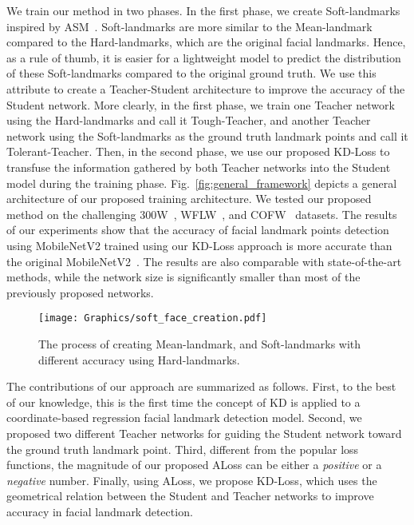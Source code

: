 \documentclass[times,twocolumn,final,authoryear]{elsarticle}
\begin{document}
We train our method in two phases. In the first phase, we create Soft-landmarks inspired by ASM~\cite{cootes1998active}. Soft-landmarks are more similar to the Mean-landmark compared to the Hard-landmarks, which are the original facial landmarks. Hence, as a rule of thumb, it is easier for a lightweight model to predict the distribution of these Soft-landmarks compared to the original ground truth. We use this attribute to create a Teacher-Student architecture to improve the accuracy of the Student network. More clearly, in the first phase, we train one Teacher network using the Hard-landmarks and call it Tough-Teacher, and another Teacher network using the Soft-landmarks as the ground truth landmark points and call it Tolerant-Teacher.
Then, in the second phase, we use our proposed KD-Loss to transfuse the information gathered by both Teacher networks into the Student model during the training phase. Fig.~\ref{fig:general_framework} depicts a general architecture of our proposed training architecture. We tested our proposed method on the challenging 300W~\cite{sagonas2013300}, WFLW~\cite{wu2018look}, and COFW~\cite{burgos2013robust} datasets. The results of our experiments show that the accuracy of facial landmark points detection using MobileNetV2 trained using our KD-Loss approach is more accurate than the original MobileNetV2~\cite{sandler2018MobileNetV2}. The results are also comparable with state-of-the-art methods, while the network size is significantly smaller than most of the previously proposed networks.
\begin{figure}[t!]
  \centering
  \texttt{[image: Graphics/soft\_face\_creation.pdf]}
  \caption{The process of creating Mean-landmark, and Soft-landmarks with different accuracy using Hard-landmarks.}
  \label{fig:soft_face_creationss}
\end{figure}


The contributions of our approach are summarized as follows. First, to the best of our knowledge, this is the first time the concept of KD is applied to a coordinate-based regression facial landmark detection model. Second, we proposed two different Teacher networks for guiding the Student network toward the ground truth landmark point. Third, different from the popular loss functions, the magnitude of our proposed ALoss can be either a \textit{positive} or a \textit{negative} number. Finally, using ALoss, we propose KD-Loss, which uses the geometrical relation between the Student and Teacher networks to improve accuracy in facial landmark detection. 
\end{document}
